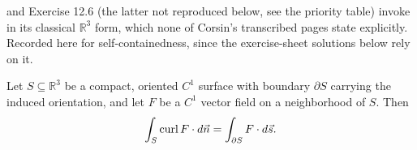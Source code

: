 \begin{ainote}
 and Exercise 12.6 (the latter not reproduced below, see the priority table)
invoke  in its classical $\mathbb{R}^3$ form, which none of Corsin's
transcribed pages state explicitly. Recorded here for self-containedness, since the
exercise-sheet solutions below rely on it.
\end{ainote}

\begin{theorem}
\label{thm:stokes_classical}
Let $S \subseteq \mathbb{R}^3$ be a compact, oriented $C^1$ surface with boundary $\partial S$
carrying the induced orientation, and let $F$ be a $C^1$ vector field on a neighborhood of
$S$. Then
\[\int_S \operatorname{curl} F \cdot d\vec{n} = \int_{\partial S} F \cdot d\vec{s}.\]
\end{theorem}
